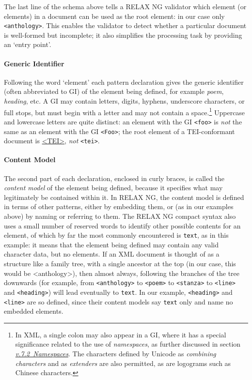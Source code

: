 The last line of the schema above tells a RELAX NG validator which element (or elements) in a document can be used as the root element: in our case only \texttt{<anthology>}. This enables the validator to detect whether a particular document is well-formed but incomplete; it also simplifies the processing task by providing an ‘entry point’.
\paragraph[{Generic Identifier}]{Generic Identifier}\label{SG141x}\par
Following the word ‘element’ each pattern declaration gives the generic identifier (often abbreviated to GI) of the element being defined, for example \textit{poem}, \textit{heading}, etc. A GI may contain letters, digits, hyphens, underscore characters, or full stops, but must begin with a letter and may not contain a space.\footnote{In XML, a single colon may also appear in a GI, where it has a special significance related to the use of \textit{namespaces}, as further discussed in section \textit{\hyperref[SGname]{v.7.2\ Namespaces}}. The characters defined by Unicode as \textit{combining characters} and as \textit{extenders} are also permitted, as are logograms such as Chinese characters.} Uppercase and lowercase letters are quite distinct: an element with the GI \texttt{<foo>} is \textit{not} the same as an element with the GI \texttt{<Foo>}; the root element of a TEI-conformant document is \hyperref[TEI.TEI]{<TEI>}, \textit{not} \texttt{<tei>}.
\paragraph[{Content Model}]{Content Model}\label{SG143}\par
The second part of each declaration, enclosed in curly braces, is called the \textit{content model} of the element being defined, because it specifies what may legitimately be contained within it. In RELAX NG, the content model is defined in terms of other patterns, either by embedding them, or (as in our examples above) by naming or referring to them. The RELAX NG compact syntax also uses a small number of reserved words to identify other possible contents for an element, of which by far the most commonly encountered is \texttt{text}, as in this example: it means that the element being defined may contain any valid character data, but no elements. If an XML document is thought of as a structure like a family tree, with a single ancestor at the top (in our case, this would be <anthology>), then almost always, following the branches of the tree downwards (for example, from \texttt{<anthology>} to \texttt{<poem>} to \texttt{<stanza>} to \texttt{<line>} and \texttt{<heading>}) will lead eventually to \texttt{text}. In our example, \texttt{<heading>} and \texttt{<line>} are so defined, since their content models say \texttt{text} only and name no embedded elements.

